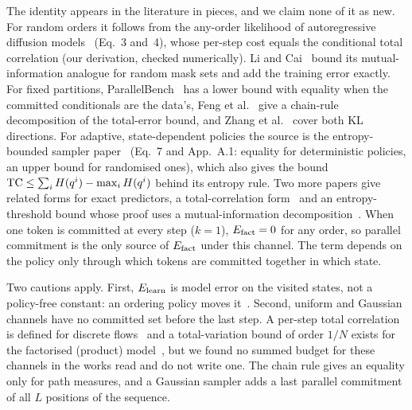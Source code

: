 The identity appears in the literature in pieces, and we claim none of it as new. For random orders it follows from the any-order likelihood of autoregressive diffusion models~\cite{arXiv:2110.02037} (Eq.~3 and~4), whose per-step cost equals the conditional total correlation (our derivation, checked numerically). Li and Cai~\cite{arXiv:2505.21400} bound its mutual-information analogue for random mask sets and add the training error exactly. For fixed partitions, ParallelBench~\cite{arXiv:2510.04767} has a lower bound with equality when the committed conditionals are the data's, Feng et al.~\cite{arXiv:2502.09622} give a chain-rule decomposition of the total-error bound, and Zhang et al.~\cite{arXiv:2602.00286} cover both KL directions. For adaptive, state-dependent policies the source is the entropy-bounded sampler paper~\cite{arXiv:2505.24857} (Eq.~7 and App.~A.1: equality for deterministic policies, an upper bound for randomised ones), which also gives the bound $\mathrm{TC}\le\sum_iH(q^i)-\max_iH(q^i)$ behind its entropy rule. Two more papers give related forms for exact predictors, a total-correlation form~\cite{arXiv:2608.25505} and an entropy-threshold bound whose proof uses a mutual-information decomposition~\cite{arXiv:2603.22248}. %
When one token is committed at every step ($k=1$), $E_{\mathrm{fact}}=0$ for any order, so parallel commitment is the only source of $E_{\mathrm{fact}}$ under this channel. The term depends on the policy only through which tokens are committed together in which state. %

Two cautions apply. First, $E_{\mathrm{learn}}$ is model error on the visited states, not a policy-free constant: an ordering policy moves it~\cite{arXiv:2502.06768,arXiv:2602.00286}. Second, uniform and Gaussian channels have no committed set before the last step. A per-step total correlation is defined for discrete flows~\cite{arXiv:2507.15897} and a total-variation bound of order $1/N$ exists for the factorised (product) model~\cite{arXiv:2410.08709}, but we found no summed budget for these channels in the works read and do not write one. The chain rule gives an equality only for path measures, and a Gaussian sampler adds a last parallel commitment of all $L$ positions of the sequence. %

